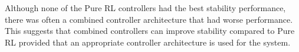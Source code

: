 Although none of the Pure RL controllers had the best stability performance, there was often a combined controller architecture that had worse performance. This suggests that combined controllers can improve stability compared to Pure RL provided that an appropriate controller architecture is used for the system.







